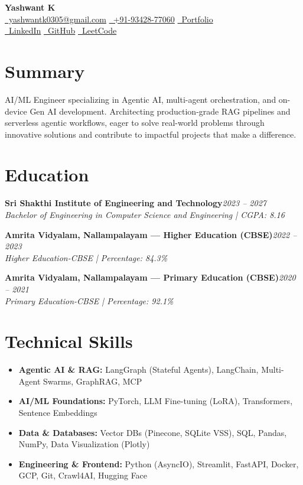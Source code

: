 \documentclass[a4paper,10pt]{article}
\newcommand{\entry}[2]{\textbf{#1}\hfill\textit{#2}\\[-1pt]}
\begin{document}
\begin{center}
    {\Huge\bfseries\color{primaryColor} Yashwant K} \\ \vspace{4pt}
    \small
    \href{mailto:yashwantk0305@gmail.com}{\faEnvelope\ yashwantk0305@gmail.com} \quad
    \href{tel:+919342877060}{\faPhone\ +91-93428-77060} \quad
    \href{https://portfolio-website-steel-zeta-99.vercel.app/}{\faGlobe\ Portfolio} \\ \vspace{2pt}
    \href{https://www.linkedin.com/in/yashwant-k-935aa0292/}{\faLinkedin\ LinkedIn} \quad
    \href{https://github.com/Yashwant00CR7}{\faGithub\ GitHub} \quad
    \href{https://leetcode.com/u/Yashwant_K/}{\faCode\ LeetCode}
\end{center}

\vspace{-4pt}

\section*{Summary}
AI/ML Engineer specializing in Agentic AI, multi-agent orchestration, and on-device Gen AI development. Architecting production-grade RAG pipelines and serverless agentic workflows, eager to solve real-world problems through innovative solutions and contribute to impactful projects that make a difference.
\section*{Education}
\vspace{4pt}
\entry{Sri Shakthi Institute of Engineering and Technology}{2023 -- 2027}
\textit{Bachelor of Engineering in Computer Science and Engineering \;|\; CGPA: 8.16} \vspace{6pt}

\entry{Amrita Vidyalam, Nallampalayam --- Higher Education (CBSE)}{2022 -- 2023}
\textit{Higher Education-CBSE \;|\; Percentage: 84.3\%} \vspace{6pt}

\entry{Amrita Vidyalam, Nallampalayam --- Primary Education (CBSE)}{2020 -- 2021}
\textit{Primary Education-CBSE \;|\; Percentage: 92.1\%}

\section*{Technical Skills}
\begin{itemize}[leftmargin=*, noitemsep, topsep=2pt]
    \item \textbf{Agentic AI \& RAG:} LangGraph (Stateful Agents), LangChain, Multi-Agent Swarms, GraphRAG, MCP
    \item \textbf{AI/ML Foundations:} PyTorch, LLM Fine-tuning (LoRA), Transformers, Sentence Embeddings
    \item \textbf{Data \& Databases:} Vector DBs (Pinecone, SQLite VSS), SQL, Pandas, NumPy, Data Visualization (Plotly)
    \item \textbf{Engineering \& Frontend:} Python (AsyncIO), Streamlit, FastAPI, Docker, GCP, Git, Crawl4AI, Hugging Face
\end{itemize}
\end{document}
